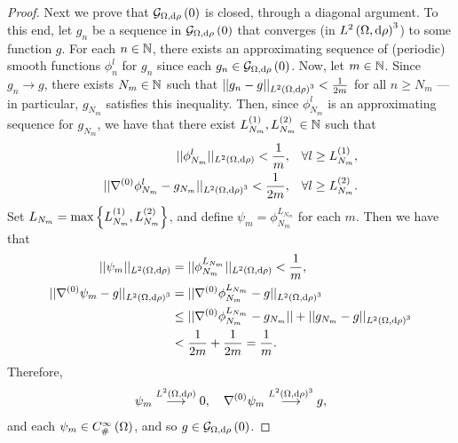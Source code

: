 \begin{proof}
	Next we prove that $\mathcal{G}_{ \Omega, \mathrm{d}\rho}\left( 0 \right)$ is closed, through a diagonal argument.
	To this end, let $g_n$ be a sequence in $\mathcal{G}_{ \Omega, \mathrm{d}\rho}\left( 0 \right)$ that converges (in $L^{2}\left( \Omega,\mathrm{d} \rho \right)^3$) to some function $g$.
	For each $n\in\mathbb{N}$, there exists an approximating sequence of (periodic) smooth functions $\phi_n^l$ for $g_n$ since each $g_n\in\mathcal{G}_{ \Omega, \mathrm{d}\rho}\left( 0 \right)$.
	Now, let $m\in\mathbb{N}$.
	Since $g_n\rightarrow g$, there exists $N_m\in\mathbb{N}$ such that $\lvert\lvert g_n-g \rvert\rvert_{L^{2}\left( \Omega,\mathrm{d} \rho \right)^3}<\frac{1}{2m}$ for all $n\geq N_m$ --- in particular, $g_{N_m}$ satisfies this inequality.
	Then, since $\phi_{N_m}^l$ is an approximating sequence for $g_{N_m}$, we have that there exist $L_{N_m}^{(1)}, L_{N_m}^{(2)}\in\mathbb{N}$ such that
	\begin{align*}
		\lvert\lvert \phi_{N_m}^l \rvert\rvert_{L^{2}\left( \Omega,\mathrm{d} \rho \right)} < \frac{1}{m}, &\quad\forall l\geq L_{N_m}^{(1)}, \\
		\lvert\lvert \nabla^{(0)}\phi_{N_m}^l - g_{N_m} \rvert\rvert_{L^{2}\left( \Omega,\mathrm{d} \rho \right)^3} < \frac{1}{2m}, &\quad\forall l\geq L_{N_m}^{(2)}.
	\end{align*}	 
	Set $L_{N_m} = \max\left\{  L_{N_m}^{(1)}, L_{N_m}^{(2)}  \right\}$, and define $\psi_m = \phi^{L_{N_m}}_{N_m}$ for each $m$.
	Then we have that
	\begin{align*}
		\lvert\lvert \psi_m \rvert\rvert_{L^{2}\left( \Omega,\mathrm{d} \rho \right)} &= \lvert\lvert \phi_{N_m}^{L_{N_m}} \rvert\rvert_{L^{2}\left( \Omega,\mathrm{d} \rho \right)} < \frac{1}{m}, \\
		\lvert\lvert \nabla^{(0)}\psi_m - g \rvert\rvert_{L^{2}\left( \Omega,\mathrm{d} \rho \right)^3} &= \lvert\lvert \nabla^{(0)}\phi_{N_m}^{L_{N_m}} - g \rvert\rvert_{L^{2}\left( \Omega,\mathrm{d} \rho \right)^3} \\
		&\leq \lvert\lvert \nabla^{(0)}\phi_{N_m}^{L_{N_m}} - g_{N_m} \rvert\rvert + \lvert\lvert g_{N_m} - g \rvert\rvert_{L^{2}\left( \Omega,\mathrm{d} \rho \right)^3} \\
		&< \frac{1}{2m} + \frac{1}{2m} = \frac{1}{m}.
	\end{align*}
	Therefore,
	\begin{align*}
		\psi_m \overset{L^{2}\left( \Omega,\mathrm{d} \rho \right)}{\longrightarrow} 0, \quad \nabla^{(0)}\psi_m \overset{L^{2}\left( \Omega,\mathrm{d} \rho \right)^3}{\longrightarrow} g,
	\end{align*}
	and each $\psi_m\in C^{\infty}_{\#}\left( \Omega \right)$, and so $g\in\mathcal{G}_{ \Omega, \mathrm{d}\rho}\left( 0 \right)$.
\end{proof}

